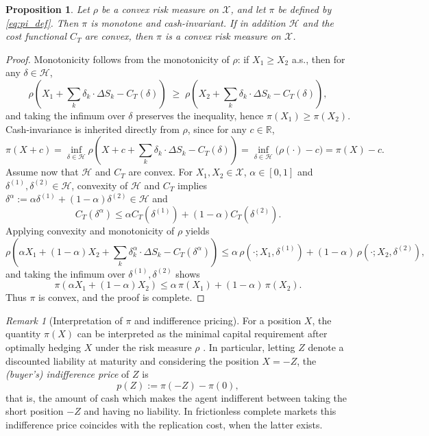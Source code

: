 \documentclass[12pt,a4paper]{article}
\theoremstyle{definition}
\theoremstyle{plain}
\newtheorem{proposition}{Proposition}[section]
\theoremstyle{remark}
\newtheorem{remark}{Remark}[section]
\theoremstyle{plain}
\begin{document}
\begin{proposition}
\label{prop:pi_convex_risk_measure}
Let $\rho$ be a convex risk measure on $\mathcal X$, and let $\pi$ be defined by \eqref{eq:pi_def}. 
Then $\pi$ is monotone and cash-invariant. 
If in addition $\mathcal H$ and the cost functional $C_T$ are convex, then $\pi$ is a convex risk measure on $\mathcal X$.
\end{proposition}

\begin{proof}
Monotonicity follows from the monotonicity of $\rho$: if $X_1\ge X_2$ a.s., then for any $\delta\in\mathcal H$,
\[
\rho\!\left(X_1 + \sum_{k} \delta_k\cdot\Delta S_k - C_T(\delta)\right)
\;\ge\;
\rho\!\left(X_2 + \sum_{k} \delta_k\cdot\Delta S_k - C_T(\delta)\right),
\]
and taking the infimum over $\delta$ preserves the inequality, hence $\pi(X_1)\ge \pi(X_2)$.  
Cash-invariance is inherited directly from $\rho$, since for any $c\in\mathbb R$,
\[
\pi(X+c)
= \inf_{\delta\in\mathcal H} \rho\!\left(X + c + \sum_{k} \delta_k\cdot\Delta S_k - C_T(\delta)\right)
= \inf_{\delta\in\mathcal H} \bigl(\rho(\cdot) - c\bigr)
= \pi(X) - c.
\]
Assume now that $\mathcal H$ and $C_T$ are convex. For $X_1,X_2\in\mathcal X$, $\alpha\in[0,1]$ and $\delta^{(1)},\delta^{(2)}\in\mathcal H$, convexity of $\mathcal H$ and $C_T$ implies $\delta^\alpha := \alpha\delta^{(1)} + (1-\alpha)\delta^{(2)}\in\mathcal H$ and
\[
C_T(\delta^\alpha)\le \alpha C_T(\delta^{(1)}) + (1-\alpha)C_T(\delta^{(2)}).
\]
Applying convexity and monotonicity of $\rho$ yields
\[
\rho\!\left(\alpha X_1 + (1-\alpha)X_2 + \sum_k \delta^\alpha_k\cdot\Delta S_k - C_T(\delta^\alpha)\right)
\le \alpha\,\rho(\cdot;X_1,\delta^{(1)}) + (1-\alpha)\,\rho(\cdot;X_2,\delta^{(2)}),
\]
and taking the infimum over $\delta^{(1)},\delta^{(2)}$ shows
\[
\pi(\alpha X_1 + (1-\alpha)X_2)
\le \alpha\,\pi(X_1) + (1-\alpha)\,\pi(X_2).
\]
Thus $\pi$ is convex, and the proof is complete.
\end{proof}

\begin{remark}[Interpretation of $\pi$ and indifference pricing]
\label{rem:indifference_price}
For a position $X$, the quantity $\pi(X)$ can be interpreted as the minimal capital requirement after optimally hedging $X$ under the risk measure $\rho$ \cite{Buehler2019DeepHedging}. 
In particular, letting $Z$ denote a discounted liability at maturity and considering the position $X=-Z$, the \emph{(buyer’s) indifference price} of $Z$ is
\[
    p(Z) := \pi(-Z) - \pi(0),
\]
that is, the amount of cash which makes the agent indifferent between taking the short position $-Z$ and having no liability. 
In frictionless complete markets this indifference price coincides with the replication cost, when the latter exists.
\end{remark}
\end{document}
